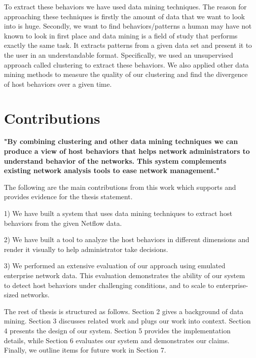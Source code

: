 To extract these behaviors we have used data mining techniques. The reason for approaching these techniques is firstly the amount of data that we want to look into is huge. Secondly, we want to find behaviors/patterns a human may have not known to look in first place and data mining is a field of study that performs exactly the same task. It extracts patterns from a given data set and present it to the user in an understandable format. Specifically, we used an unsupervised approach called clustering to extract these behaviors. We also applied other data mining methods to measure the quality of our clustering and find the divergence of host behaviors over a given time.  


\section{Contributions} \label{contributions}
\textbf{"By combining clustering and other data mining techniques we can produce a view of host behaviors that helps network administrators to understand behavior of the networks. This system complements existing network analysis tools to ease network management."}

The following are the main contributions from this work which supports and provides evidence for the thesis statement.

1) We have built a system that uses data mining techniques to extract host behaviors from the given Netflow data.

2) We have built a tool to analyze the host behaviors in different dimensions and render it visually to help administrator take decisions.

3) We performed an extensive evaluation of our approach using
emulated enterprise network data. This evaluation
demonstrates the ability of our system to detect host behaviors under challenging conditions, and to scale to enterprise-sized networks.


The rest of thesis is structured as follows. Section 2 gives a background of data mining. Section 3 discusses related work and plugs our work into context. Section 4 presents the design of our system. Section 5 provides the implementation details, while  Section 6 evaluates our system  and demonstrates our claims. Finally, we outline items for future work in Section 7.
